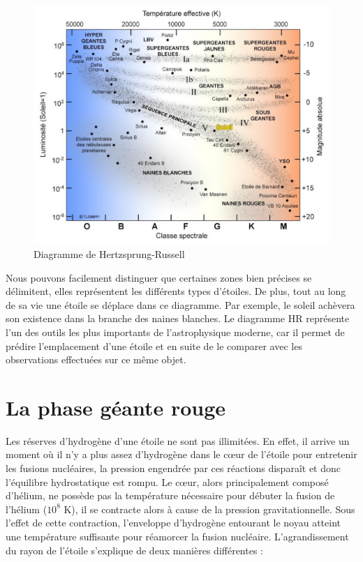 \begin{figure}[H]\vspace{1cm}
	\centering
	\includegraphics[scale=0.4]{images/hr-diagram}
	\caption[Diagramme de Hertzsprung-Russell]{Diagramme de Hertzsprung-Russell}
	\label{Fig. 2.2}
\end{figure}\bigskip

Nous pouvons facilement distinguer que certaines zones bien précises se délimitent, elles représentent les différents types d’étoiles. De plus, tout au long de sa vie une étoile se déplace dans ce diagramme. Par exemple, le soleil achèvera son existence dans la branche des naines blanches. Le diagramme HR représente l’un des outils les plus importants de l’astrophysique moderne, car il permet de prédire l’emplacement d’une étoile et en suite de le comparer avec les observations effectuées sur ce même objet.\bigskip

\section{La phase géante rouge}\label{2.2}

Les réserves d’hydrogène d’une étoile ne sont pas illimitées. En effet, il arrive un moment où il n’y a plus assez d’hydrogène dans le cœur de l’étoile pour entretenir les fusions nucléaires, la pression engendrée par ces réactions disparaît et donc l’équilibre hydrostatique est rompu. Le cœur, alors principalement composé d’hélium, ne possède pas la température nécessaire pour débuter la fusion de l’hélium ($10^{8}$ K), il se contracte alors à cause de la pression gravitationnelle. Sous l’effet de cette contraction, l’enveloppe d’hydrogène entourant le noyau atteint une température suffisante pour réamorcer la fusion nucléaire. L’agrandissement du rayon de l’étoile s’explique de deux manières différentes :

